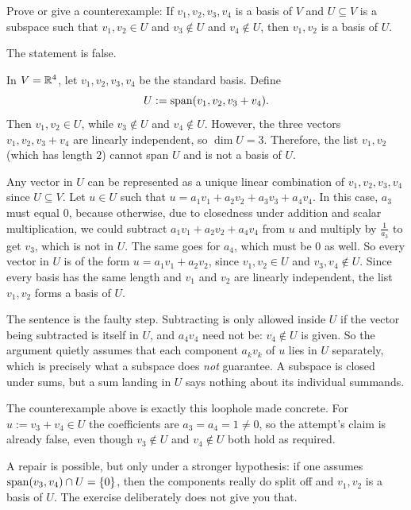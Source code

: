 \begin{xrcs}
  Prove or give a counterexample: If $v_1, v_2, v_3, v_4$ is a basis of $V$ and $U \subseteq V$ is a subspace such that $v_1, v_2 \in U$ and $v_3 \notin U$ and $v_4 \notin U$, then $v_1, v_2$ is a basis of $U$.

  \begin{xsol}
    The statement is false.

     In $V = \mathbb{R}^4$, let $v_1, v_2, v_3, v_4$ be the standard basis. Define
    \begin{equation}
      U := \operatorname{span} (v_1, v_2, v_3 + v_4).
    \end{equation}
    Then $v_1, v_2 \in U$, while $v_3 \notin U$ and $v_4 \notin U$.
    However, the three vectors $v_1, v_2, v_3+v_4$ are linearly independent, so $\dim U = 3$.
    Therefore, the list $v_1, v_2$ (which has length $2$) cannot span $U$ and is not a basis of $U$.
  \end{xsol}

  \begin{failedattempt}
    Any vector in $U$ can be represented as a unique linear combination of $v_1, v_2, v_3, v_4$ since $U \subseteq V$. Let $u\in U$ such that $u=a_1 v_1 + a_2 v_2 + a_3 v_3 + a_4 v_4$. In this case, $a_3$ must equal $0$, because otherwise, due to closedness under addition and scalar multiplication, we could subtract $a_1 v_1 + a_2 v_2+a_4v_4$ from $u$ and multiply by $\frac{1}{a_3}$ to get $v_3$, which is not in $U$. The same goes for $a_4$, which must be $0$ as well. So every vector in $U$ is of the form $u=a_1 v_1 + a_2 v_2$, since $v_1, v_2 \in U$ and $v_3, v_4 \notin U$. Since every basis has the same length and $v_1$ and $v_2$ are linearly independent, the list $v_1, v_2$ forms a basis of $U$.
  \end{failedattempt}

  \begin{ainote}
    The sentence  is the faulty step. Subtracting is only allowed inside $U$ if the vector being subtracted is itself in $U$, and $a_4 v_4$ need not be: $v_4 \notin U$ is given. So the argument quietly assumes that each component $a_k v_k$ of $u$ lies in $U$ separately, which is precisely what a subspace does \emph{not} guarantee. A subspace is closed under sums, but a sum landing in $U$ says nothing about its individual summands.

    The counterexample above is exactly this loophole made concrete. For $u := v_3 + v_4 \in U$ the coefficients are $a_3 = a_4 = 1 \neq 0$, so the attempt's claim  is already false, even though $v_3 \notin U$ and $v_4 \notin U$ both hold as required.

    A repair is possible, but only under a stronger hypothesis: if one assumes $\operatorname{span} (v_3,v_4) \cap U = \{0\}$, then the components really do split off and $v_1,v_2$ is a basis of $U$. The exercise deliberately does not give you that.
  \end{ainote}
\end{xrcs}

